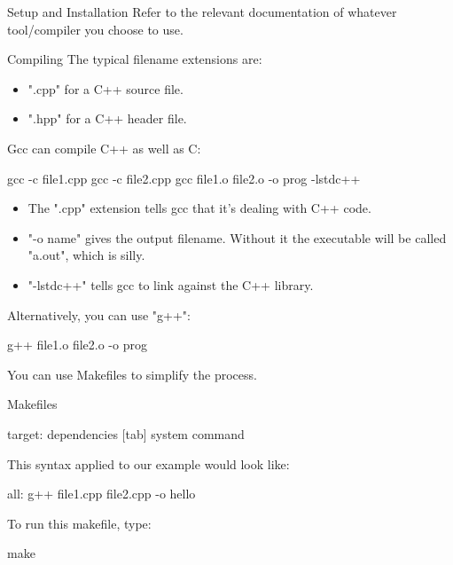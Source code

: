 \documentclass[../lecture1-introduction.tex]{subfiles}
\begin{document}
\begin{frame}[fragile]{Setup and Installation}
    Refer to the relevant documentation of whatever tool/compiler you choose to use.
\end{frame}


\begin{frame}[fragile]{Compiling}
    The typical filename extensions are:
    \begin{itemize}
        \item ".cpp" for a C++ source file.
        \item ".hpp" for a C++ header file.
    \end{itemize}
    Gcc can compile C++ as well as C:
    \begin{commandshell}
gcc -c file1.cpp
gcc -c file2.cpp
gcc file1.o file2.o -o prog -lstdc++
    \end{commandshell}
    \begin{itemize}
        \item The ".cpp" extension tells gcc that it's dealing with C++ code.
        \item "-o name" gives the output filename. Without it the executable will be
        called "a.out", which is silly.
        \item "-lstdc++" tells gcc to link against the C++ library.
    \end{itemize}
    Alternatively, you can use "g++":
    \begin{commandshell}
g++ file1.o file2.o -o prog
    \end{commandshell}
    You can use Makefiles to simplify the process.
\end{frame}


\begin{frame}[fragile]{Makefiles}
    \begin{cppcode}
target: dependencies
[tab] system command
    \end{cppcode}
    This syntax applied to our example would look like:
    \begin{cppcode}
all:
    g++ file1.cpp file2.cpp -o hello
    \end{cppcode}
    To run this makefile, type:
    \begin{commandshell}
make
    \end{commandshell}
\end{frame}

\end{document}
